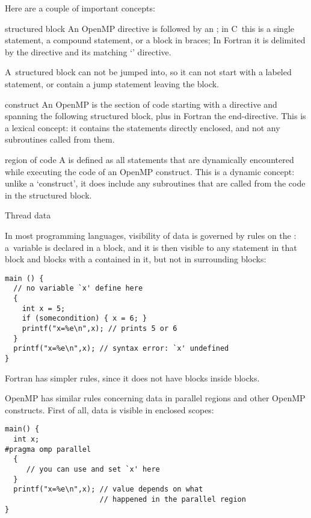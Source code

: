 Here are a couple of important concepts:
\begin{definition}
\item[structured block] An OpenMP directive is followed by an
  ; in C~this is a single statement, a
  compound statement, or a block in braces; In Fortran it is
  delimited by the directive and its matching `' directive.

  A~structured block can not be jumped into, so it can not start with a
  labeled statement, or contain a jump statement leaving the block.
\item[construct] An OpenMP  is the section of code
  starting with a directive and spanning the following structured block,
  plus in Fortran the end-directive. This is a lexical concept: it contains
  the statements directly enclosed, and not any subroutines called from them.
\item[region of code] A  is defined as all statements
  that are dynamically encountered while executing the code of an OpenMP construct.
  This is a dynamic concept: unlike a `construct', it does include any subroutines
  that are called from the code in the structured block.
\end{definition}

 {Thread data}

In most programming languages, visibility of data
is governed by rules on the :
a~variable is declared in a block, and it is then visible to any
statement in that block and blocks with a 
contained in it, but not in surrounding blocks:
\begin{lstlisting}
main () {
  // no variable `x' define here
  {
    int x = 5;
    if (somecondition) { x = 6; }
    printf("x=%e\n",x); // prints 5 or 6
  }
  printf("x=%e\n",x); // syntax error: `x' undefined
}
\end{lstlisting}
Fortran has simpler rules, since it does not have blocks inside blocks.

OpenMP has similar rules concerning data in parallel regions
and other OpenMP constructs. First of all, data is visible
in enclosed scopes:
\begin{lstlisting}
main() {
  int x;
#pragma omp parallel
  {
     // you can use and set `x' here
  }
  printf("x=%e\n",x); // value depends on what
                      // happened in the parallel region
}
\end{lstlisting}

